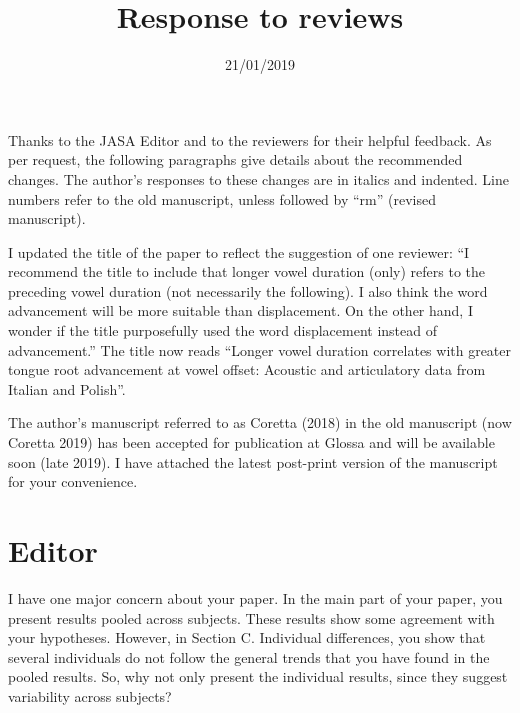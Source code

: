 \documentclass[]{article}
\title{Response to reviews}
\author{}
\date{21/01/2019}
\begin{document}
\maketitle

Thanks to the JASA Editor and to the reviewers for their helpful
feedback. As per request, the following paragraphs give details about
the recommended changes. The author's responses to these changes are in
italics and indented. Line numbers refer to the old manuscript, unless
followed by ``rm'' (revised manuscript).

I updated the title of the paper to reflect the suggestion of one
reviewer: ``I recommend the title to include that longer vowel duration
(only) refers to the preceding vowel duration (not necessarily the
following). I also think the word advancement will be more suitable than
displacement. On the other hand, I wonder if the title purposefully used
the word displacement instead of advancement.'' The title now reads
``Longer vowel duration correlates with greater tongue root advancement
at vowel offset: Acoustic and articulatory data from Italian and
Polish''.

The author's manuscript referred to as Coretta (2018) in the old
manuscript (now Coretta 2019) has been accepted for publication at
Glossa and will be available soon (late 2019). I have attached the
latest post-print version of the manuscript for your convenience.

\hypertarget{editor}{%
\section{Editor}\label{editor}}

I have one major concern about your paper. In the main part of your
paper, you present results pooled across subjects. These results show
some agreement with your hypotheses. However, in Section C. Individual
differences, you show that several individuals do not follow the general
trends that you have found in the pooled results. So, why not only
present the individual results, since they suggest variability across
subjects?
\end{document}
